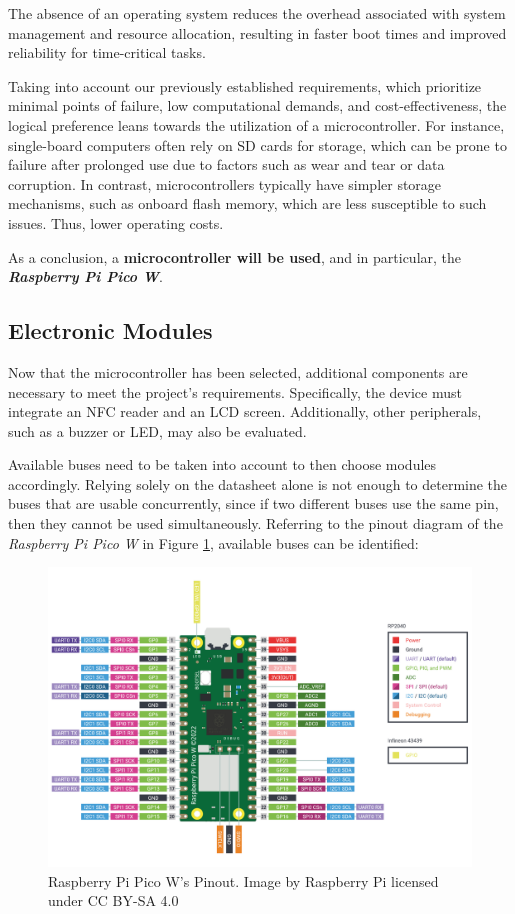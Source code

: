 The absence of an operating system reduces the overhead associated with system management and resource allocation, resulting 
in faster boot times and improved reliability for time-critical tasks.

Taking into account our previously established requirements, which prioritize minimal points of failure, low computational 
demands, and cost-effectiveness, the logical preference leans towards the utilization of a microcontroller. For instance, 
single-board computers often rely on SD cards for storage, which can be prone to failure after prolonged use due to factors 
such as wear and tear or data corruption. In contrast, microcontrollers typically have simpler storage mechanisms, such as 
onboard flash memory, which are less susceptible to such issues. Thus, lower operating costs.

As a conclusion, a \textbf{microcontroller will be used}, and in particular, the \textit{\textbf{Raspberry Pi Pico W}}.

%
%
\subsection{Electronic Modules}

Now that the microcontroller has been selected, additional components are necessary to meet the project's requirements. 
Specifically, the device must integrate an NFC reader and an LCD screen. Additionally, other peripherals, such as a buzzer 
or LED, may also be evaluated.

Available buses need to be taken into account to then choose modules accordingly. Relying solely on the datasheet alone is 
not enough to determine the buses that are usable concurrently, since if two different buses use the same pin, then they 
cannot be used simultaneously. Referring to the pinout diagram of the \textit{Raspberry Pi Pico W} in Figure 
\ref{fig:piPicoPinout}, available buses can be identified:

\begin{figure}[h]
	\centering
	\includegraphics[width = 1\textwidth]{Imagenes/Vectorial/picow-pinout.pdf}
	\caption{Raspberry Pi Pico W's Pinout. Image by Raspberry Pi licensed under CC BY-SA 4.0}
	\label{fig:piPicoPinout}
\end{figure}

